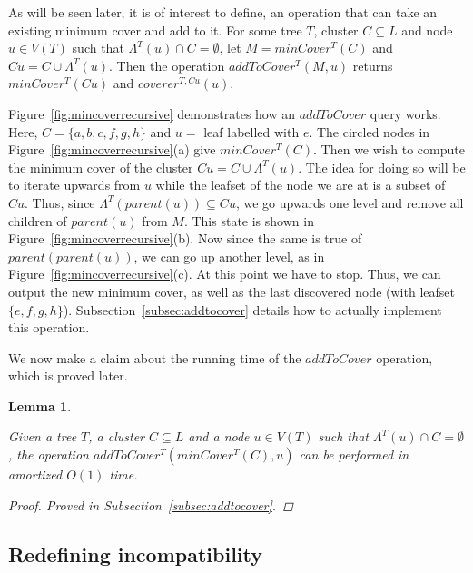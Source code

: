 \documentclass{article}
\newcommand{\leafset}{\Lambda}
\newtheorem{mincoverruntime}[incompatibility]{Lemma}
\begin{document}
    As will be seen later, it is of interest to define, an operation that can take an existing minimum cover and add to it. For some tree $T$, cluster $C \subseteq L$ and node $u \in V(T)$ such that $\leafset^{T}(u) \cap C = \emptyset$, let $M = minCover^{T}(C)$ and $Cu = C \cup \leafset^{T}(u)$. Then the operation $addToCover^{T}(M, u)$ returns $minCover^{T}(Cu)$ and $coverer^{T, Cu}(u)$.

    Figure~\ref{fig:mincoverrecursive} demonstrates how an $addToCover$ query works. Here, $C = \{a, b, c, f, g, h\}$ and $u =$ leaf labelled with $e$. The circled nodes in Figure~\ref{fig:mincoverrecursive}(a) give $minCover^{T}(C)$. Then we wish to compute the minimum cover of the cluster $Cu = C \cup \leafset^{T}(u)$. The idea for doing so will be to iterate upwards from $u$ while the leafset of the node we are at is a subset of $Cu$. Thus, since $\leafset^{T}(parent(u)) \subseteq Cu$, we go upwards one level and remove all children of $parent(u)$ from $M$. This state is shown in Figure~\ref{fig:mincoverrecursive}(b). Now since the same is true of $parent(parent(u))$, we can go up another level, as in Figure~\ref{fig:mincoverrecursive}(c). At this point we have to stop. Thus, we can output the new minimum cover, as well as the last discovered node (with leafset $\{e, f, g, h\}$). Subsection~\ref{subsec:addtocover} details how to actually implement this operation.

    We now make a claim about the running time of the $addToCover$ operation, which is proved later.
    \newline

    \begin{mincoverruntime}
        \label{lem:mincoverruntime}

        Given a tree $T$, a cluster $C \subseteq L$ and a node $u \in V(T)$ such that $\leafset^{T}(u) \cap C = \emptyset$, the operation $addToCover^{T}(minCover^{T}(C), u)$ can be performed in amortized $O(1)$ time.

        \begin{proof}
            Proved in Subsection~\ref{subsec:addtocover}.
        \end{proof}
    \end{mincoverruntime}

    \subsection{Redefining incompatibility}
    \label{subsec:redefiningincompatibility}
\end{document}
